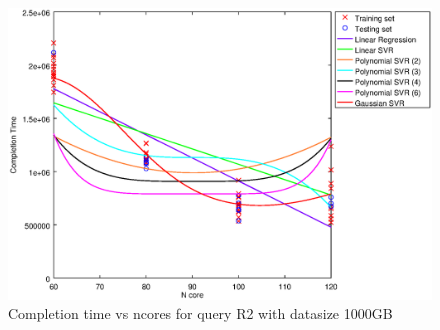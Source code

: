 
\begin {figure}[hbtp]
\centering
\includegraphics[width=\textwidth]{output/R2_1000_ONLY_1_LINEAR_NCORE/plot_R2_1000.eps}
\caption{Completion time vs ncores for query R2 with datasize 1000GB}
\label{fig:only_1_linear_R2_1000}
\end {figure}
